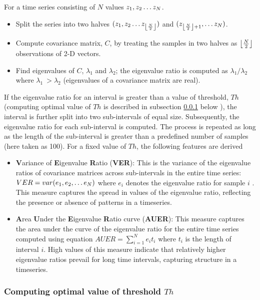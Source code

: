 \documentclass[journal]{IEEEtran}
\DeclarePairedDelimiter\floor{\lfloor}{\rfloor}
\begin{document}
	For a time series consisting of $N$ values  $z_1, z_2 \mathellipsis z_N$.
	\begin{itemize}
		\item  Split the series into two halves $(z_1, z_2 \mathellipsis z_{\floor*{\frac{N}{2}}})$ and $(z_{\floor*{\frac{N}{2}} + 1}, \mathellipsis z_N)$.
		\item Compute covariance matrix, $C$,  by treating the samples in two halves as $\floor*{\frac{N}{2}}$ observations of 2-D vectors.
		\item Find eigenvalues of $C$, $\lambda_1$ and $\lambda_2$; the eigenvalue ratio is computed as  $\lambda_1/\lambda_2$ where $\lambda_1 \ > \lambda_2$ (eigenvalues of a covariance matrix are real).
	\end{itemize}
	If the eigenvalue ratio for an interval is greater than a value of threshold, $Th$ (computing optimal value of $Th$ is described in subsection \ref{compute_threshold} below ), the interval is further split into two sub-intervals of equal size.  Subsequently, the eigenvalue ratio for each sub-interval is computed. The process is repeated as long as the length of the sub-interval is greater than a predefined number of samples (here taken as 100).
	For a fixed value of $Th$, the following features are derived
	\begin{itemize}
		\item \textbf{V}ariance of \textbf{E}igenvalue \textbf{R}atio (\textbf{VER}): This is the variance of the eigenvalue ratios of covariance matrices across sub-intervals in the entire time series: $VER=var(e_1,e_2,\mathellipsis e_N)$ where $e_i$  denotes the eigenvalue ratio for sample  $i$ . This measure captures the spread in values of the eigenvalue ratio, reflecting the presence or absence of patterns in a timeseries.
		\item \textbf{A}rea \textbf{U}nder the \textbf{E}igenvalue \textbf{R}atio curve (\textbf{AUER}): This measure captures the area under the curve of the eigenvalue ratio for the entire time series computed using equation $AUER=\sum_{i=1}^{N} e_{i}t_{i}$ where $t_i$ is the length of interval $i$. High values of this measure indicate that relatively higher eigenvalue ratios prevail for long time intervals, capturing structure in a timeseries.
	\end{itemize}
	
	\subsubsection{ Computing optimal value of threshold $Th$} \label{compute_threshold}
\end{document}
